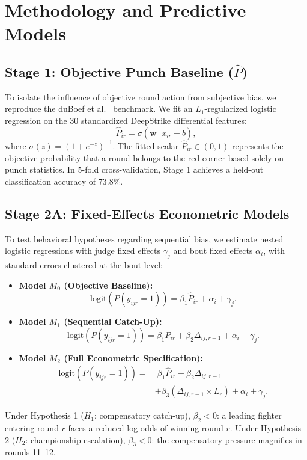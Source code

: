 \documentclass[conference]{IEEEtran}
\begin{document}
\section{Methodology and Predictive Models}

\subsection{Stage 1: Objective Punch Baseline ($\hat{P}$)}
To isolate the influence of objective round action from subjective bias, we reproduce the duBoef et al.~\cite{duboef2021} benchmark. We fit an $L_1$-regularized logistic regression on the 30 standardized DeepStrike differential features:
\begin{equation}
\hat{P}_{ir} = \sigma\left( \mathbf{w}^{\top} x_{ir} + b \right),
\end{equation}
where $\sigma(z) = (1 + e^{-z})^{-1}$. The fitted scalar $\hat{P}_{ir} \in (0, 1)$ represents the objective probability that a round belongs to the red corner based solely on punch statistics. In 5-fold cross-validation, Stage 1 achieves a held-out classification accuracy of 73.8\%.

\subsection{Stage 2A: Fixed-Effects Econometric Models}
To test behavioral hypotheses regarding sequential bias, we estimate nested logistic regressions with judge fixed effects $\gamma_j$ and bout fixed effects $\alpha_i$, with standard errors clustered at the bout level:
\begin{itemize}
    \item \textbf{Model $M_0$ (Objective Baseline):}
    \begin{equation}
    \text{logit}(P(y_{ijr}=1)) = \beta_1 \hat{P}_{ir} + \alpha_i + \gamma_j.
    \end{equation}
    \item \textbf{Model $M_1$ (Sequential Catch-Up):}
    \begin{equation}
    \text{logit}(P(y_{ijr}=1)) = \beta_1 \hat{P}_{ir} + \beta_2 \Delta_{ij,r-1} + \alpha_i + \gamma_j.
    \end{equation}
    \item \textbf{Model $M_2$ (Full Econometric Specification):}
    \begin{align}
    \text{logit}(P(y_{ijr}=1)) = &\;\beta_1 \hat{P}_{ir} + \beta_2 \Delta_{ij,r-1} \nonumber \\
    &+ \beta_3 (\Delta_{ij,r-1} \times L_r) + \alpha_i + \gamma_j.
    \label{eq:m2}
    \end{align}
\end{itemize}
Under Hypothesis 1 ($H_1$: compensatory catch-up), $\beta_2 < 0$: a leading fighter entering round $r$ faces a reduced log-odds of winning round $r$. Under Hypothesis 2 ($H_2$: championship escalation), $\beta_3 < 0$: the compensatory pressure magnifies in rounds 11--12. 
\end{document}
